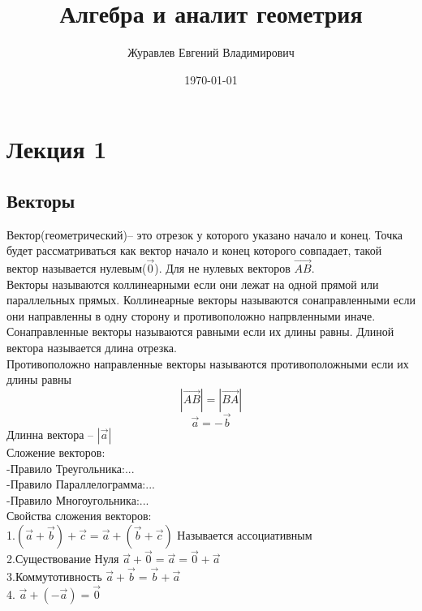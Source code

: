 \documentclass[a4paper, 12pt]{article}
\title{Алгебра и аналит геометрия }
\author{Журавлев Евгений Владимирович}
\date{\today}
\begin{document}
\maketitle
\section{Лекция 1}
\subsection{Векторы}
Вектор(геометрический)-- это отрезок у которого указано начало и конец.
Точка будет рассматриваться как вектор начало и конец которого совпадает, такой вектор называется нулевым($\vec{0}$). Для не нулевых векторов $  \vec{AB}$.\\
Векторы называются коллинеарными если они лежат на одной прямой или параллельных прямых. Коллинеарные векторы называются сонаправленными если они направленны в одну сторону и противоположно напрвленными иначе.\\
Сонаправленные векторы называются равными если их длины равны. Длиной вектора называется длина отрезка.\\
Противоположно направленные векторы называются противоположными если их длины равны \[
	|\vec{AB}| = |\vec{BA}|
\] 
\[
	\vec{a} = -\vec{b}		
\]
Длинна вектора -- $|\vec{a}|$\\
Сложение векторов: \\
-Правило Треугольника:...\\
-Правило Параллелограмма:...\\
-Правило Многоугольника:...\\
Свойства сложения векторов:\\
1.$ (\vec{a} + \vec{b})+\vec{c} = \vec{a} + (\vec{b}+\vec{c}) $ Называется ассоциативным\\
2.Существование Нуля $ \vec{a} + \vec{0} = \vec{a} = \vec{0} + \vec{a} $\\
3.Коммутотивность $ \vec{a} + \vec{b}= \vec{b} + \vec{a} $\\
4. $ \vec{a} + (-\vec{a}) = \vec{0} $\\
\end{document}
